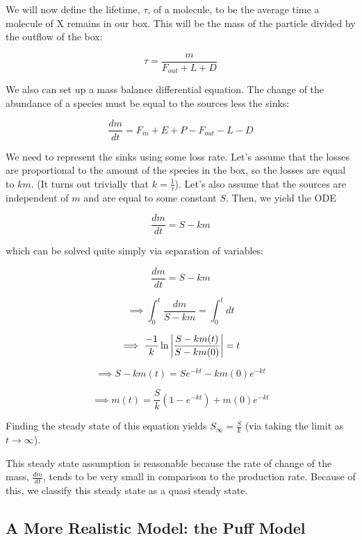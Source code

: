 \documentclass{article}
\begin{document}
We will now define the lifetime, $\tau$, of a molecule, to be the average time a molecule of X remains in our box. 
This will be the mass of the particle divided by the outflow of the box:

\begin{equation}
    \tau = \frac{m}{F_{out}+L+D}    
\end{equation}

We also can set up a mass balance differential equation. The change of the abundance of a species must be equal to the sources less the sinks:

\begin{equation}
    \frac{dm}{dt} = F_{in} + E + P - F_{out} - L - D
\end{equation}

We need to represent the sinks using some loss rate. Let's assume that the losses are proportional to the amount of the species in the box, so the losses are
equal to $km$. (It turns out trivially that $k = \frac{1}{\tau}$). Let's also assume that the sources are independent of $m$ and are 
equal to some constant $S$. Then, we yield the ODE

\begin{equation}
    \frac{dm}{dt} = S - km
\end{equation}

which can be solved quite simply via separation of variables:

$$
    \frac{dm}{dt} = S - km
$$

$$
    \implies \int_0^t \frac{dm}{S-km} = \int_0^t dt
$$

$$
    \implies \frac{-1}{k} \ln{\abs{\frac{S-km(t)}{S-km(0)}}} = t
$$

$$
    \implies S - km(t) = Se^{-kt} - km(0)e^{-kt}
$$

\begin{equation}
    \implies m(t) = \frac{S}{k}(1-e^{-kt}) + m(0)e^{-kt}
\end{equation}

Finding the steady state of this equation yields $S_\infty = \frac{S}{k}$ (via taking the limit as $t \rightarrow \infty$).

This steady state assumption is reasonable because the rate of change of the mass, $\frac{dm}{dt}$, tends to be very small in
comparison to the production rate. Because of this, we classify this steady state as a quasi steady state. 

\subsection{A More Realistic Model: the Puff Model}
\end{document}
